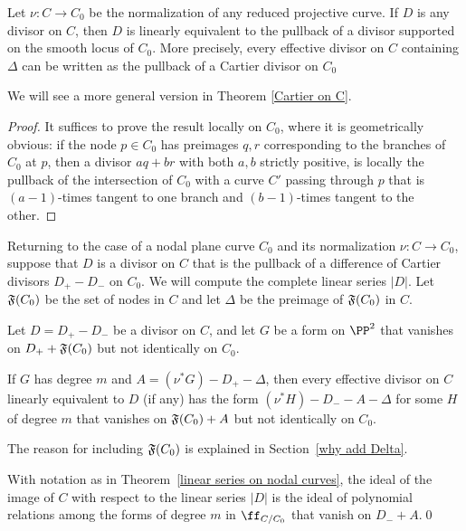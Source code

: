 \begin{lemma}
Let $\nu: C\to C_{0}$ be the normalization of any reduced projective curve. If $D$ is any divisor
on $C$, then $D$ is linearly equivalent to the pullback of a divisor supported on the smooth locus of  $C_{0}$. More precisely,  every effective divisor on $C$ containing $\Delta$ can be written as the pullback
of a Cartier divisor on $C_{0}$\end{lemma}

We will see a more general version in Theorem \ref{Cartier on C}.

\begin{proof}
It suffices to prove the result locally on $C_{0}$, where it is geometrically obvious:  if the node
$p\in C_{0}$ has preimages $q,r$ corresponding to the branches of $C_{0}$ at $p$, then
a divisor $aq+br$ with both $a,b$ strictly positive, is locally the pullback of the intersection of $C_{0}$
with a curve $C'$ passing through $p$  that is $(a-1)$-times tangent to one branch and
$(b-1)$-times tangent to the other.
\end{proof}


Returning to the case of a nodal plane curve $C_{0}$ and its normalization $\nu: C\to C_{0}$,
suppose that $D$ is a divisor on $C$ that is the pullback of a difference of Cartier
divisors $D_{+}-D_{-}$ on $C_{0}$. We will compute the complete linear series $|D|$.
Let $\adj(C_{0})$ be the set of nodes in $C$ and let $\Delta$ be the preimage of $\adj(C_{0})$ in $C$.

\begin{theorem}\label{linear series on nodal curves}
Let $D = D_{+}-D_{-}$ be a divisor on $C$, and let $G$ be a form on $\PP^{2}$ 
that vanishes on  $D_{+}+\adj(C_{0})$ but not identically on $C_{0}$.

If $G$ has degree $m$ and $A = (\nu^{*}G)-D_{+}-\Delta$, then every effective divisor on
$C$ linearly equivalent to $D$ (if any) has the form $(\nu^*H)-D_{-}-A-\Delta$ for some $H$ of degree $m$
that vanishes on $\adj(C_{0})+A$ but not identically on $C_{0}$.
\end{theorem}
 
 The reason for including $\adj(C_{0})$ is explained in Section~\ref{why add Delta}.
\begin{corollary}
With notation as in Theorem~\ref{linear series on nodal curves}, the ideal of the image of
$C$ with respect to the linear series $|D|$ is the ideal of polynomial relations among the forms
of degree $m$ in $\ff_{C/C_{0}}$ that vanish on $D_{-}+ A$.\qed
\end{corollary}

